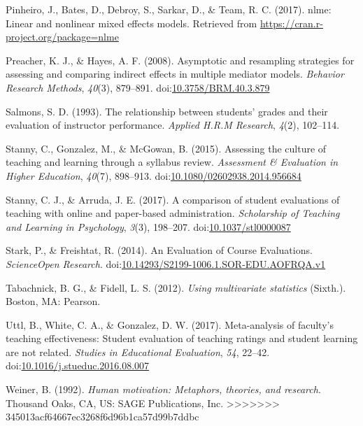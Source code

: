 \documentclass[man]{apa6}
\theoremstyle{definition}
\theoremstyle{definition}
\theoremstyle{definition}
\theoremstyle{remark}
\begin{document}
\leavevmode\hypertarget{ref-Pinheiro2017}{}%
Pinheiro, J., Bates, D., Debroy, S., Sarkar, D., \& Team, R. C. (2017). nlme: Linear and nonlinear mixed effects models. Retrieved from \url{https://cran.r-project.org/package=nlme}

\leavevmode\hypertarget{ref-Preacher2008}{}%
Preacher, K. J., \& Hayes, A. F. (2008). Asymptotic and resampling strategies for assessing and comparing indirect effects in multiple mediator models. \emph{Behavior Research Methods}, \emph{40}(3), 879--891. doi:\href{https://doi.org/10.3758/BRM.40.3.879}{10.3758/BRM.40.3.879}

\leavevmode\hypertarget{ref-Salmons1993}{}%
Salmons, S. D. (1993). The relationship between students' grades and their evaluation of instructor performance. \emph{Applied H.R.M Research}, \emph{4}(2), 102--114.

\leavevmode\hypertarget{ref-Stanny2015}{}%
Stanny, C., Gonzalez, M., \& McGowan, B. (2015). Assessing the culture of teaching and learning through a syllabus review. \emph{Assessment \& Evaluation in Higher Education}, \emph{40}(7), 898--913. doi:\href{https://doi.org/10.1080/02602938.2014.956684}{10.1080/02602938.2014.956684}

\leavevmode\hypertarget{ref-Stanny2017}{}%
Stanny, C. J., \& Arruda, J. E. (2017). A comparison of student evaluations of teaching with online and paper-based administration. \emph{Scholarship of Teaching and Learning in Psychology}, \emph{3}(3), 198--207. doi:\href{https://doi.org/10.1037/stl0000087}{10.1037/stl0000087}

\leavevmode\hypertarget{ref-Stark2014}{}%
Stark, P., \& Freishtat, R. (2014). An Evaluation of Course Evaluations. \emph{ScienceOpen Research}. doi:\href{https://doi.org/10.14293/S2199-1006.1.SOR-EDU.AOFRQA.v1}{10.14293/S2199-1006.1.SOR-EDU.AOFRQA.v1}

\leavevmode\hypertarget{ref-Tabachnick2012}{}%
Tabachnick, B. G., \& Fidell, L. S. (2012). \emph{Using multivariate statistics} (Sixth.). Boston, MA: Pearson.

\leavevmode\hypertarget{ref-Uttl2017}{}%
Uttl, B., White, C. A., \& Gonzalez, D. W. (2017). Meta-analysis of faculty's teaching effectiveness: Student evaluation of teaching ratings and student learning are not related. \emph{Studies in Educational Evaluation}, \emph{54}, 22--42. doi:\href{https://doi.org/10.1016/j.stueduc.2016.08.007}{10.1016/j.stueduc.2016.08.007}

\leavevmode\hypertarget{ref-Weiner1992}{}%
Weiner, B. (1992). \emph{Human motivation: Metaphors, theories, and research}. Thousand Oaks, CA, US: SAGE Publications, Inc.
>>>>>>> 345013acf64667ec3268f6d96b1ca57d99b7ddbc
\end{document}
